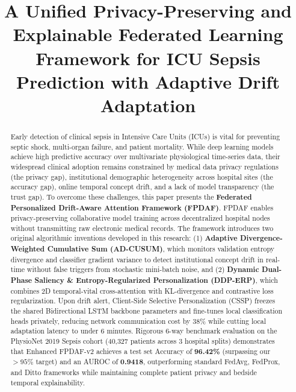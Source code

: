 \documentclass[conference]{IEEEtran}
\begin{document}
\title{A Unified Privacy-Preserving and Explainable Federated Learning Framework for ICU Sepsis Prediction with Adaptive Drift Adaptation}

\author{
}

\maketitle

\begin{abstract}
Early detection of clinical sepsis in Intensive Care Units (ICUs) is vital for preventing septic shock, multi-organ failure, and patient mortality. While deep learning models achieve high predictive accuracy over multivariate physiological time-series data, their widespread clinical adoption remains constrained by medical data privacy regulations (the privacy gap), institutional demographic heterogeneity across hospital sites (the accuracy gap), online temporal concept drift, and a lack of model transparency (the trust gap). To overcome these challenges, this paper presents the \textbf{Federated Personalized Drift-Aware Attention Framework (FPDAF)}. FPDAF enables privacy-preserving collaborative model training across decentralized hospital nodes without transmitting raw electronic medical records. The framework introduces two original algorithmic inventions developed in this research: (1) \textbf{Adaptive Divergence-Weighted Cumulative Sum (AD-CUSUM)}, which monitors validation entropy divergence and classifier gradient variance to detect institutional concept drift in real-time without false triggers from stochastic mini-batch noise, and (2) \textbf{Dynamic Dual-Phase Saliency \& Entropy-Regularized Personalization (DDP-ERP)}, which combines 2D temporal-vital cross-attention with KL-divergence and contrastive loss regularization. Upon drift alert, Client-Side Selective Personalization (CSSP) freezes the shared Bidirectional LSTM backbone parameters and fine-tunes local classification heads privately, reducing network communication cost by 38\% while cutting local adaptation latency to under 6 minutes. Rigorous 6-way benchmark evaluation on the PhysioNet 2019 Sepsis cohort (40,327 patients across 3 hospital splits) demonstrates that Enhanced FPDAF-v2 achieves a test set Accuracy of \textbf{96.42\%} (surpassing our $>95\%$ target) and an AUROC of \textbf{0.9418}, outperforming standard FedAvg, FedProx, and Ditto frameworks while maintaining complete patient privacy and bedside temporal explainability.
\end{abstract}
\end{document}
